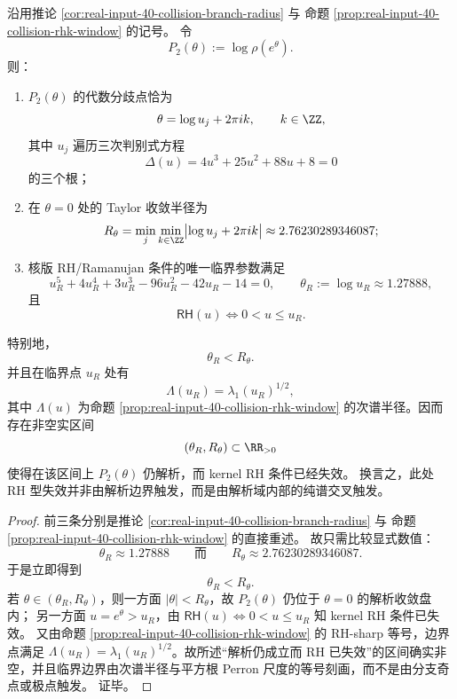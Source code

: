 \begin{theorem}\label{thm:xi-rh-critical-before-nearest-complex-branch}
沿用推论 \ref{cor:real-input-40-collision-branch-radius} 与
命题 \ref{prop:real-input-40-collision-rhk-window} 的记号。
令
\[
P_2(\theta):=\log \rho(e^\theta).
\]
则：
\begin{enumerate}
  \item \(P_2(\theta)\) 的代数分歧点恰为
  \[
  \theta=\log u_j+2\pi i k,\qquad k\in\ZZ,
  \]
  其中 \(u_j\) 遍历三次判别式方程
  \[
  \Delta(u)=4u^3+25u^2+88u+8=0
  \]
  的三个根；
  \item 在 \(\theta=0\) 处的 Taylor 收敛半径为
  \[
  R_\theta=\min_j\min_{k\in\ZZ}\bigl|\log u_j+2\pi i k\bigr|
  \approx 2.76230289346087;
  \]
  \item 核版 RH/Ramanujan 条件的唯一临界参数满足
  \[
  u_R^5+4u_R^4+3u_R^3-96u_R^2-42u_R-14=0,
  \qquad
  \theta_R:=\log u_R\approx 1.27888,
  \]
  且
  \[
  \textsf{RH}(u)\Longleftrightarrow 0<u\le u_R.
  \]
\end{enumerate}
特别地，
\[
\boxed{\;
\theta_R<R_\theta.\;}
\]
并且在临界点 \(u_R\) 处有
\[
\Lambda(u_R)=\lambda_1(u_R)^{1/2},
\]
其中 \(\Lambda(u)\) 为命题 \ref{prop:real-input-40-collision-rhk-window} 的次谱半径。因而存在非空实区间
\[
(\theta_R,R_\theta)\subset \RR_{>0}
\]
使得在该区间上 \(P_2(\theta)\) 仍解析，而 kernel RH 条件已经失效。
换言之，此处 RH 型失效并非由解析边界触发，而是由解析域内部的纯谱交叉触发。
\end{theorem}
\begin{proof}
前三条分别是推论 \ref{cor:real-input-40-collision-branch-radius} 与
命题 \ref{prop:real-input-40-collision-rhk-window} 的直接重述。
故只需比较显式数值：
\[
\theta_R\approx 1.27888
\qquad\text{而}\qquad
R_\theta\approx 2.76230289346087.
\]
于是立即得到
\[
\theta_R<R_\theta.
\]
若 \(\theta\in(\theta_R,R_\theta)\)，则一方面 \(|\theta|<R_\theta\)，故
\(P_2(\theta)\) 仍位于 \(\theta=0\) 的解析收敛盘内；
另一方面 \(u=e^\theta>u_R\)，由
\(
\textsf{RH}(u)\Longleftrightarrow 0<u\le u_R
\)
知 kernel RH 条件已失效。
又由命题 \ref{prop:real-input-40-collision-rhk-window} 的 RH-sharp 等号，边界点满足
\(\Lambda(u_R)=\lambda_1(u_R)^{1/2}\)。故所述“解析仍成立而 RH 已失效”的区间确实非空，并且临界边界由次谱半径与平方根 Perron 尺度的等号刻画，而不是由分支奇点或极点触发。
证毕。
\end{proof}





\endinput
